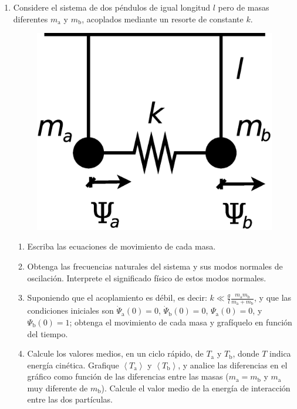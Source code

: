 \documentclass[11pt,spanish]{article}
\begin{document}
\begin{enumerate}

    \item Considere el sistema de dos péndulos de igual longitud $l$ pero de
    masas diferentes $m_\text{a}$ y $m_\text{b}$, acoplados mediante un resorte de
    constante $k$. 

    \begin{figure}[H]
        \centering{}\includegraphics[clip,scale=0.3]{figs/ej1-7}
    \end{figure}

    \begin{enumerate}
        \item Escriba las ecuaciones de movimiento de cada masa.

        \item Obtenga las frecuencias naturales del sistema y sus modos normales
        de oscilación. Interprete el significado físico de estos modos normales.
 
        \item Suponiendo que el acoplamiento es débil, es decir:
        $k \ll \frac{g}{l} \frac{m_\text{a}m_\text{b}}{m_\text{a}+m_\text{b}}$,
        y que las condiciones
        iniciales son $\dot{\Psi}_\text{a}(0)=0$, $\dot{\Psi}_\text{b}(0)=0$, 
        $\Psi_\text{a}(0)=0$, y $\Psi_\text{b}(0)=1$; obtenga el movimiento de
        cada masa y grafíquelo en función del tiempo.

        \item Calcule los valores medios, en un ciclo rápido, de $T_\text{a}$ y
        $T_\text{b}$, donde $T$ indica energía cinética. Grafique
        $\left\langle T_\text{a}\right\rangle$ y
        $\left\langle T_\text{b}\right\rangle$, y analice las diferencias en
        el gráfico como función de las diferencias entre las masas
        ($m_\text{a}=m_\text{b}$ y $m_\text{a}$ muy diferente de $m_\text{b}$).
        Calcule el valor medio de la energía de interacción entre las dos
        partículas.


\end{enumerate}
\end{enumerate}
\end{document}
